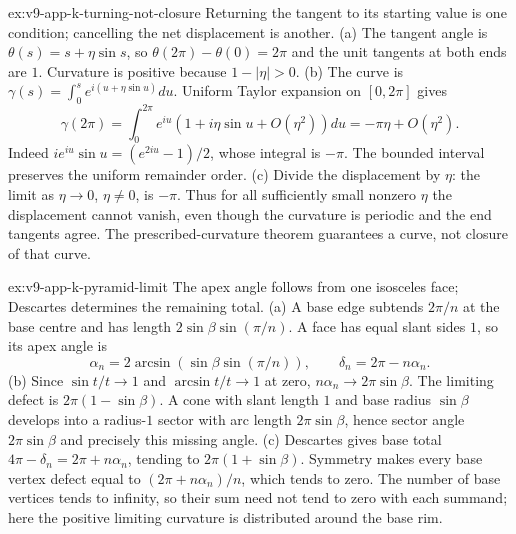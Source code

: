\begin{solution}{ex:v9-app-k-turning-not-closure}
\idea Returning the tangent to its starting value is one condition; cancelling the net displacement is another.
\writeup (a) The tangent angle is $\theta(s)=s+\eta\sin s$, so $\theta(2\pi)-\theta(0)=2\pi$ and the unit tangents at both ends are $1$. Curvature is positive because $1-|\eta|>0$.
(b) The curve is $\gamma(s)=\int_0^s e^{i(u+\eta\sin u)}du$. Uniform Taylor expansion on $[0,2\pi]$ gives
\[
\gamma(2\pi)=\int_0^{2\pi}e^{iu}(1+i\eta\sin u+O(\eta^2))du
=-\pi\eta+O(\eta^2).
\]
Indeed $ie^{iu}\sin u=(e^{2iu}-1)/2$, whose integral is $-\pi$. The bounded interval preserves the uniform remainder order.
(c) Divide the displacement by $\eta$: the limit as $\eta\to0$, $\eta\ne0$, is $-\pi$. Thus for all sufficiently small nonzero $\eta$ the displacement cannot vanish, even though the curvature is periodic and the end tangents agree. The prescribed-curvature theorem guarantees a curve, not closure of that curve.
\end{solution}

\begin{solution}{ex:v9-app-k-pyramid-limit}
\idea The apex angle follows from one isosceles face; Descartes determines the remaining total.
\writeup (a) A base edge subtends $2\pi/n$ at the base centre and has length $2\sin\beta\sin(\pi/n)$. A face has equal slant sides $1$, so its apex angle is
\[
\alpha_n=2\arcsin(\sin\beta\sin(\pi/n)),\qquad
\delta_n=2\pi-n\alpha_n.
\]
(b) Since $\sin t/t\to1$ and $\arcsin t/t\to1$ at zero, $n\alpha_n\to2\pi\sin\beta$. The limiting defect is $2\pi(1-\sin\beta)$. A cone with slant length $1$ and base radius $\sin\beta$ develops into a radius-$1$ sector with arc length $2\pi\sin\beta$, hence sector angle $2\pi\sin\beta$ and precisely this missing angle.
(c) Descartes gives base total $4\pi-\delta_n=2\pi+n\alpha_n$, tending to $2\pi(1+\sin\beta)$. Symmetry makes every base vertex defect equal to $(2\pi+n\alpha_n)/n$, which tends to zero. The number of base vertices tends to infinity, so their sum need not tend to zero with each summand; here the positive limiting curvature is distributed around the base rim.
\end{solution}

